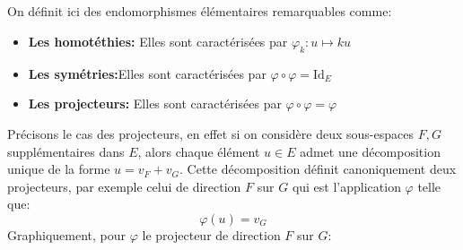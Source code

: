 \subsection*{}
On définit ici des endomorphismes élémentaires remarquables comme:
\begin{itemize}
   \item \textbf{Les homotéthies:} Elles sont caractérisées par \(\varphi_k : u \longmapsto ku\)
   \item \textbf{Les symétries:}Elles sont caractérisées par \(\varphi \circ \varphi = \text{Id}_E\)
   \item \textbf{Les projecteurs:} Elles sont caractérisées par \(\varphi \circ \varphi = \varphi\)
\end{itemize}
Précisons le cas des projecteurs, en effet si on considère deux sous-espaces \(F, G\) supplémentaires dans \(E\), alors chaque élément \(u \in E\) admet une décomposition unique de la forme \(u = v_F + v_G\). Cette décomposition définit canoniquement deux projecteurs, par exemple celui de direction \(F\) sur \(G\) qui est l'application \(\varphi\) telle que:
\[
   \varphi(u) = v_G
\]
Graphiquement, pour \(\varphi\) le projecteur de direction \(F\) sur \(G\):
\begin{center}
\end{center}
